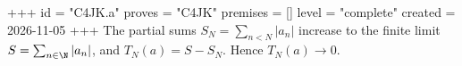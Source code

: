+++
id = "C4JK.a"
proves = "C4JK"
premises = []
level = "complete"
created = 2026-11-05
+++
The partial sums $S_N = \sum_{n < N} |a_n|$ increase to the finite limit $S = \sum_{n \in \N} |a_n|$, and $T_N(a) = S - S_N$. Hence $T_N(a) \to 0$.

